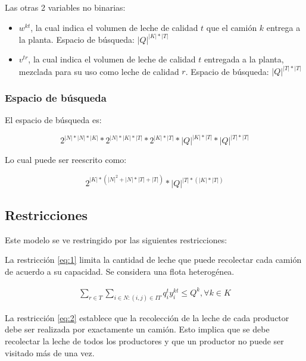 Las otras 2 variables no binarias:
\begin{itemize}
    \item $w^{k t}$, la cual indica el volumen de leche de calidad $t$ que el camión $k$ entrega a la planta. Espacio de búsqueda: $|Q|^{|K| * |T|}$
    \item $v^{t r}$, la cual indica el volumen de leche de calidad $t$ entregada a la planta, mezclada para su uso como leche de calidad $r$. Espacio de búsqueda: $|Q|^{|T| * |T|}$
\end{itemize}


\subsubsection{Espacio de búsqueda}

El espacio de búsqueda es:

\begin{equation}
    2^{|N| * |N| * |K|} * 2^{|N| * |K| * |T|}  * 2^{|K| * |T|} * |Q|^{|K| * |T|} * |Q|^{|T| * |T|}
\end{equation}

Lo cual puede ser reescrito como:

\begin{equation}
    2^{|K|*(|N|^2 + |N|*|T| + |T|)} * |Q|^{|T| * (|K| * |T|)}
\end{equation}

\subsection{Restricciones}

Este modelo se ve restringido por las siguientes restricciones:

     La restricción \ref{eq:1} limita la cantidad de leche que puede recolectar cada camión de
acuerdo a su capacidad. Se considera una flota heterogénea.
    
        \begin{align} \label{eq:1}
            \sum_{r\in T} \sum_{i \in N: (i, j) \in IT} q_{i}^{t} y_{i}^{k t} \leq Q^k, \forall k \in K
        \end{align}
        

     La restricción \ref{eq:2}  establece que la recolección de la leche de cada productor debe ser
realizada por exactamente un camión. Esto implica que se debe recolectar la leche de
todos los productores y que un productor no puede ser visitado más de una vez.

